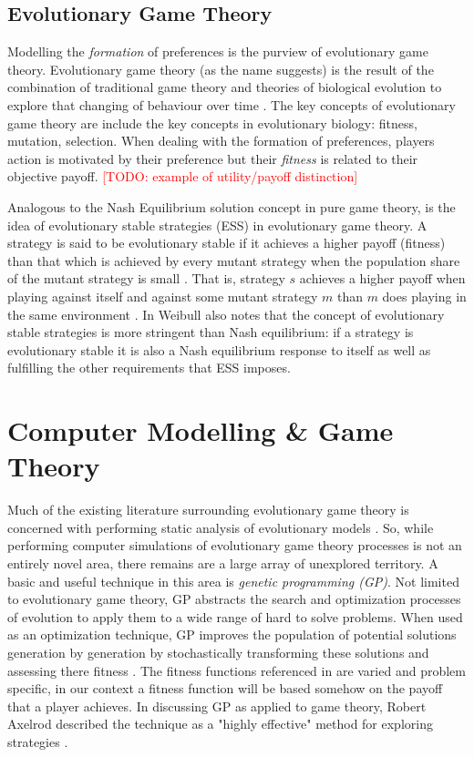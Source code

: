\documentclass[11pt]{article}
\newcommand{\todo}[1]{\textcolor{red}{[TODO: #1]}\PackageWarning{TODO:}{#1!}}
\newcommand*{\np}{\par\noindent\newline}
\begin{document}
\subsection{Evolutionary Game Theory}\label{evo_games}
Modelling the \textit{formation} of preferences is the purview of evolutionary game theory. Evolutionary game theory (as
the name suggests) is the result of the combination of traditional game theory and theories of biological evolution to
explore that changing of behaviour over time \cite{tanimoto_fundamentals_2015}. The key concepts of evolutionary game
theory are include the key concepts in evolutionary biology: fitness, mutation, selection. When dealing with the
formation of preferences, players action is motivated by their preference but their \textit{fitness} is related to their
objective payoff. \todo{example of utility/payoff distinction}


\np Analogous to the Nash Equilibrium solution concept in pure game theory, is the idea of evolutionary stable
strategies (ESS) in evolutionary game theory. A strategy is said to be evolutionary stable if it achieves a higher
payoff (fitness) than that which is achieved by every mutant strategy when the population share of the mutant strategy
is small \cite{weibull_introduction_1992}. That is, strategy $s$ achieves a higher payoff when playing against itself
and against some mutant strategy $m$ than $m$ does playing in the same environment \cite{shoham_multiagent_2008}. In
\cite{weibull_introduction_1992} Weibull also notes that the concept of evolutionary stable strategies is more
stringent than Nash equilibrium: if a strategy is evolutionary stable it is also a Nash equilibrium response to itself
as well as fulfilling the other requirements that ESS imposes.

\section{Computer Modelling \& Game Theory}\label{agent}
Much of the existing literature surrounding evolutionary game theory is concerned with performing static analysis of
evolutionary models \cite{alger_homo_2013,hetzer_evolutionary_2013,newton_preferences_2017}. So, while performing
computer simulations of evolutionary game theory processes is not an entirely novel area, there remains are a large
array of unexplored territory. A basic and useful technique in this area is \textit{genetic programming (GP)}. Not
limited to evolutionary game theory, GP abstracts the search and optimization processes of evolution to apply them to a
wide range of hard to solve problems. When used as an optimization technique, GP improves the population of potential
solutions generation by generation by stochastically transforming these solutions and assessing there fitness
\cite{poli_field_2008}. The fitness functions referenced in \cite{poli_field_2008} are varied and problem specific, in
our context a fitness function will be based somehow on the payoff that a player achieves. In discussing GP as applied
to game theory, Robert Axelrod described the technique as a "highly effective" method for exploring strategies \cite[p.
~23]{axelrod_effective_1980}. 
\end{document}
